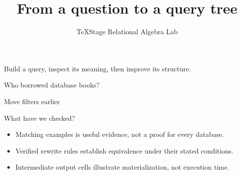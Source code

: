 \documentclass[aspectratio=169]{beamer}
\title{From a question to a query tree}
\author{TeXStage Relational Algebra Lab}
\date{}
\begin{document}
\begin{frame}\titlepage
\small Build a query, inspect its meaning, then improve its structure.
\end{frame}
\begin{frame}{Who borrowed database books?}
\end{frame}
\begin{frame}{Move filters earlier}
\end{frame}
\begin{frame}{What have we checked?}
\begin{itemize}
\item Matching examples is useful evidence, not a proof for every database.
\item Verified rewrite rules establish equivalence under their stated conditions.
\item Intermediate output cells illustrate materialization, not execution time.
\end{itemize}
\end{frame}
\end{document}
